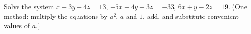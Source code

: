 Solve the system $x+3y+4z=13$, $-5x-4y+3z=-33$, $6x+y-2z=19$. (One method: multiply the equations by $a^2$, $a$ and $1$, add, and substitute convenient values of $a$.)
